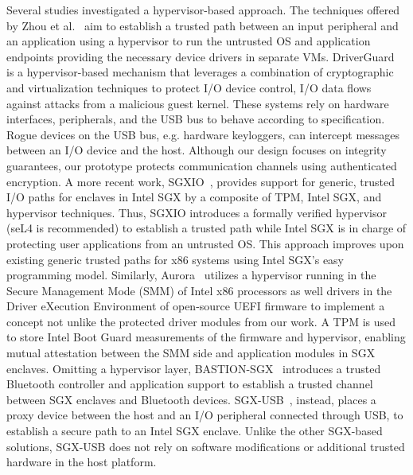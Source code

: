 Several studies investigated a hypervisor-based approach. The techniques offered
by Zhou et al.~\cite{Zhou1, Zhou2} aim to establish a trusted path between an
input peripheral and an application using a hypervisor to run the untrusted OS
and application endpoints providing the necessary device drivers in separate
VMs. DriverGuard~\cite{driverguard} is a hypervisor-based mechanism that
leverages a combination of cryptographic and virtualization techniques to
protect I/O device control, I/O data flows against attacks from a malicious
guest kernel. These systems rely on hardware interfaces, peripherals, and the
USB bus to behave according to specification. Rogue devices on the USB bus, e.g.
hardware keyloggers, can intercept messages between an I/O device and the host.
Although our design focuses on integrity guarantees, our prototype protects
communication channels using authenticated encryption. A more recent work,
SGXIO~\cite{SGXIO}, provides support for generic, trusted I/O paths for enclaves
in Intel \ac{SGX} by a composite of TPM, Intel \ac{SGX}, and hypervisor
techniques. Thus, SGXIO introduces a formally verified hypervisor (seL4 is
recommended) to establish a trusted path while Intel \ac{SGX} is in charge of
protecting user applications from an untrusted OS. This approach improves upon
existing generic trusted paths for x86 systems using Intel \ac{SGX}'s easy
programming model.
% 
Similarly, Aurora~\cite{Aurora} utilizes a hypervisor running in the Secure
Management Mode (SMM) of Intel x86 processors as well drivers in the Driver
eXecution Environment of open-source UEFI firmware to implement a concept not
unlike the protected driver modules from our work. A TPM is used to store Intel
Boot Guard measurements of the firmware and hypervisor, enabling mutual
attestation between the SMM side and application modules in SGX enclaves.
Omitting a hypervisor layer, BASTION-SGX~\cite{BASTION-SGX} introduces a trusted
Bluetooth controller and application support to establish a trusted channel
between SGX enclaves and Bluetooth devices.  SGX-USB~\cite{SGX-USB}, instead,
places a proxy device between the host and an I/O peripheral connected through
USB, to establish a secure path to an Intel \ac{SGX} enclave. Unlike the other
SGX-based solutions, SGX-USB does not rely on software modifications or
additional trusted hardware in the host platform.

